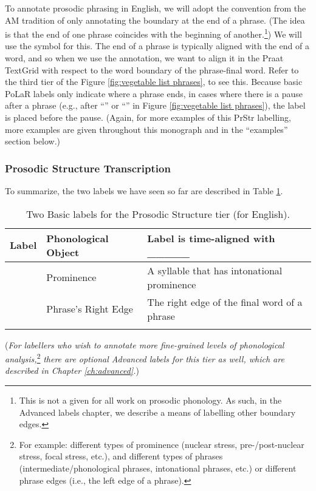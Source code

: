 To annotate prosodic phrasing in English, we will adopt the convention from the AM tradition of only annotating the boundary at the end of a phrase. (The idea is that the end of one phrase coincides with the beginning of another.\footnote{This is not a given for all work on prosodic phonology. As such, in the Advanced labels chapter, we describe a means of labelling other boundary edges.}) We will use the \textlabel{]} symbol for this. The end of a phrase is typically aligned with the end of a word, and so when we use the \textlabel{]} annotation, we want to align it in the Praat TextGrid with respect to the word boundary of the phrase-final word. Refer to the third tier of the Figure \ref{fig:vegetable list phrases}, to see this. Because basic PoLaR labels only indicate where a phrase ends, in cases where there is a pause after a phrase (e.g., after “” or “” in Figure \ref{fig:vegetable list phrases}), the \textlabel{]} label is placed before the pause. (Again, for more examples of this PrStr labelling, more examples are given throughout this monograph and in the “examples” section below.)

\subsubsection{Prosodic Structure Transcription}
To summarize, the two labels we have seen so far are described in Table \ref{2 PrStr basic labels}.

\begin{longtable}{cll} \toprule \textbf{Label} & \textbf{Phonological Object} & \textbf{Label is time-aligned with \_\_\_\_\_}\tabularnewline
\midrule \endhead
\textlabel{*} & Prominence & A syllable that has intonational prominence \tabularnewline
\textlabel{]} & Phrase’s Right Edge & The right edge of the final word of a phrase \tabularnewline
\bottomrule 
\caption{Two Basic labels for the Prosodic Structure tier (for English).%
\label{2 PrStr basic labels}%
}
\end{longtable}

(\textit{For labellers who wish to annotate more fine-grained levels of phonological analysis,}\footnote{For example: different types of prominence (nuclear stress, pre-\slash post-nuclear stress, focal stress, etc.), and different types of phrases (intermediate\slash phonological phrases, intonational phrases, etc.) or different phrase edges (i.e., the left edge of a phrase).} \textit{there are optional Advanced labels for this tier as well, which are described in Chapter \ref{ch:advanced}.})

